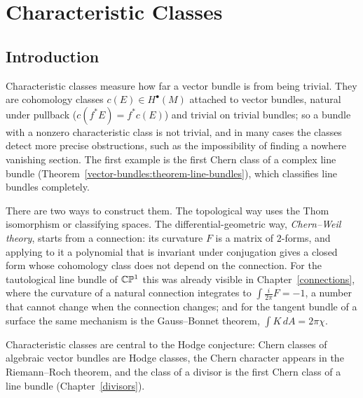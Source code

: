 \chapter{Characteristic Classes}\label{characteristic-classes}

\section{Introduction}\label{characteristic-classes:section-introduction}

Characteristic classes measure how far a vector bundle is from being trivial. They are cohomology classes $c(E) \in H^\bullet(M)$ attached to vector bundles, natural
under pullback ($c(f^*E) = f^*c(E)$) and trivial on trivial bundles; so a bundle with a nonzero characteristic class is not trivial, and in many cases the classes detect
more precise obstructions, such as the impossibility of finding a nowhere vanishing section. The first example is the first Chern class of a complex line bundle
(Theorem~\ref{vector-bundles:theorem-line-bundles}), which classifies line bundles completely.

There are two ways to construct them. The topological way uses the Thom isomorphism or classifying spaces. The differential-geometric way, \emph{Chern--Weil theory}, starts
from a connection: its curvature $F$ is a matrix of $2$-forms, and applying to it a polynomial that is invariant under conjugation gives a closed form whose cohomology class
does not depend on the connection. For the tautological line bundle of $\mathbb{C}\mathbb{P}^1$ this was already visible in Chapter~\ref{connections}, where the curvature of a natural
connection integrates to $\int\frac{i}{2\pi}F = -1$, a number that cannot change when the connection changes; and for the tangent bundle of a surface the same mechanism
is the Gauss--Bonnet theorem, $\int K\,dA = 2\pi\chi$.

Characteristic classes are central to the Hodge conjecture: Chern classes of algebraic vector bundles are Hodge classes, the Chern character appears in the Riemann--Roch
theorem, and the class of a divisor is the first Chern class of a line bundle (Chapter~\ref{divisors}).

